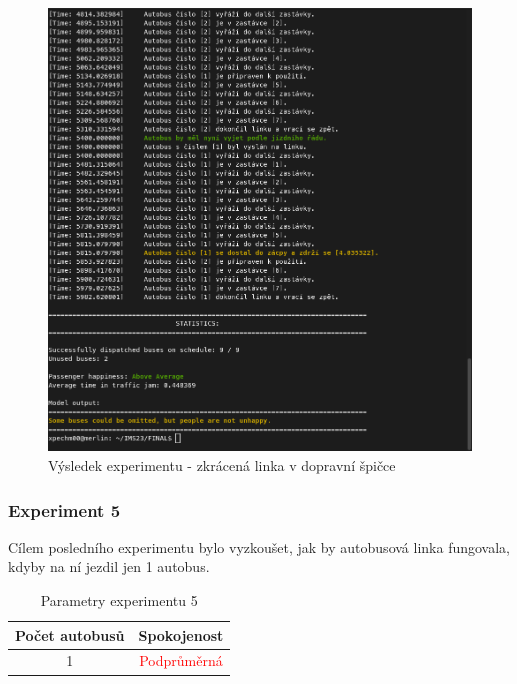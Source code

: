 \documentclass[a4paper]{article}
\begin{document}
                 \begin{figure}[H]
                \includegraphics[scale=0.37, keepaspectratio]{fig/ims_bus4.png}
                \caption{Výsledek experimentu  - zkrácená linka v dopravní špičce}
                \label{fig:experiment4}
                    \end{figure}

            \newpage
            \subsubsection{Experiment 5}
            \label{subsubsec:experiment5}

                Cílem posledního experimentu bylo vyzkoušet, jak by autobusová linka fungovala, kdyby na ní jezdil jen 1 autobus.
    
                \begin{table}[H]
                    \centering
                    \begin{tabular}{ | c | c |}
                        \hline
                        Počet autobusů & Spokojenost\\
                        \hline
                        \hline
                        1 & \textcolor{red}{Podprůměrná} \\
                        \hline
                    \end{tabular}
                    \caption{Parametry experimentu 5}
                    \label{tab:experiment5}
                \end{table}
\end{document}
